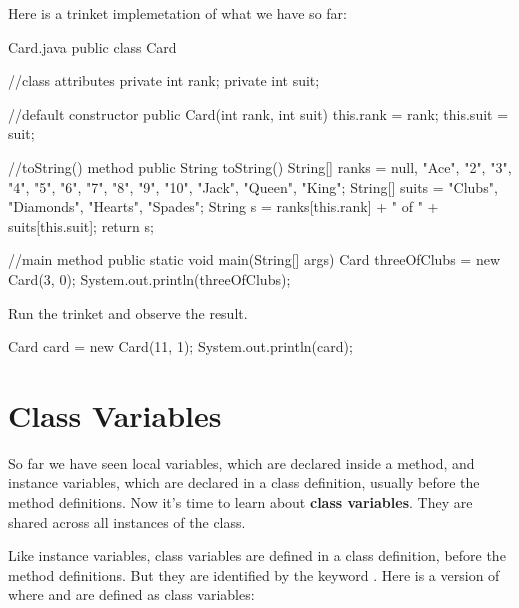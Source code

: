 Here is a trinket implemetation of what we have so far:
\begin{trinket} [420] {Card.java}
public class Card {
    //class attributes
    private int rank;
    private int suit;
    
    //default constructor
    public Card(int rank, int suit) {
        this.rank = rank;
        this.suit = suit;
    }
    
    //toString() method
    public String toString() {
       String[] ranks = {null, "Ace", "2", "3", "4", "5", "6",
               "7", "8", "9", "10", "Jack", "Queen", "King"};
       String[] suits = {"Clubs", "Diamonds", "Hearts", "Spades"};
       String s = ranks[this.rank] + " of " + suits[this.suit];
       return s;
    }
    
    //main method
    public static void main(String[] args) {
       Card threeOfClubs = new Card(3, 0);
       System.out.println(threeOfClubs);
    }
}
\end{trinket}

Run the trinket and observe the result.  


\begin{code}
Card card = new Card(11, 1);
System.out.println(card);
\end{code}


\section{Class Variables}
\label{classvar}


So far we have seen local variables, which are declared inside a method, and instance variables, which are declared in a class definition, usually before the method definitions.
Now it's time to learn about {\bf class variables}.
They are shared across all instances of the class.



Like instance variables, class variables are defined in a class definition, before the method definitions.
But they are identified by the keyword .
Here is a version of  where  and  are defined as class variables:

